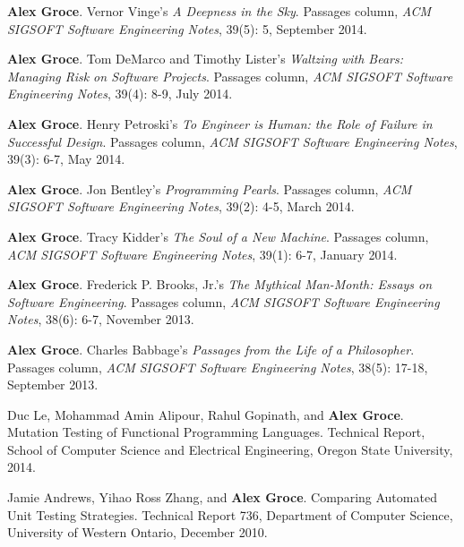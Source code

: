 \documentclass[ComputerScience]{vita}
\begin{document}
\begin{vita}
\begin{Columns, Book Reviews, and Magazine Articles}
\item {\bf Alex Groce}.
\newblock Vernor Vinge's \emph{A Deepness in the Sky}.
\newblock Passages column, \emph{ACM SIGSOFT Software Engineering Notes}, 39(5): 5, September 2014.

\item {\bf Alex Groce}.
\newblock Tom DeMarco and Timothy Lister's \emph{Waltzing with Bears: Managing Risk on Software Projects}.
\newblock Passages column, \emph{ACM SIGSOFT Software Engineering Notes}, 39(4): 8-9, July 2014.

\item {\bf Alex Groce}.
\newblock Henry Petroski's \emph{To Engineer is Human: the Role of Failure in Successful Design}.
\newblock Passages column, \emph{ACM SIGSOFT Software Engineering Notes}, 39(3): 6-7, May 2014.

\item {\bf Alex Groce}.
\newblock Jon Bentley's \emph{Programming Pearls}.
\newblock Passages column, \emph{ACM SIGSOFT Software Engineering Notes}, 39(2): 4-5, March 2014.

\item {\bf Alex Groce}.
\newblock Tracy Kidder's \emph{The Soul of a New Machine}.
\newblock Passages column, \emph{ACM SIGSOFT Software Engineering Notes}, 39(1): 6-7, January 2014.

\item {\bf Alex Groce}.
\newblock Frederick P. Brooks, Jr.'s \emph{The Mythical Man-Month: Essays on Software Engineering}.
\newblock Passages column, \emph{ACM SIGSOFT Software Engineering Notes}, 38(6): 6-7, November 2013.

\item {\bf Alex Groce}.
\newblock Charles Babbage's \emph{Passages from the Life of a Philosopher}.
\newblock Passages column, \emph{ACM SIGSOFT Software Engineering Notes}, 38(5): 17-18, September 2013.
\end{Columns, Book Reviews, and Magazine Articles}

\begin{Technical Reports}
\item
Duc Le, Mohammad Amin Alipour, Rahul Gopinath, and {\bf Alex Groce}.
\newblock Mutation Testing of Functional Programming Languages.
\newblock Technical Report, School of Computer Science and Electrical Engineering, Oregon State University, 2014.

\item
Jamie Andrews, Yihao Ross Zhang, and {\bf Alex Groce}.
\newblock Comparing Automated Unit Testing Strategies.
\newblock Technical Report 736, Department of Computer Science, University of Western Ontario, December 2010.


\end{Technical Reports}
\end{vita}
\end{document}
